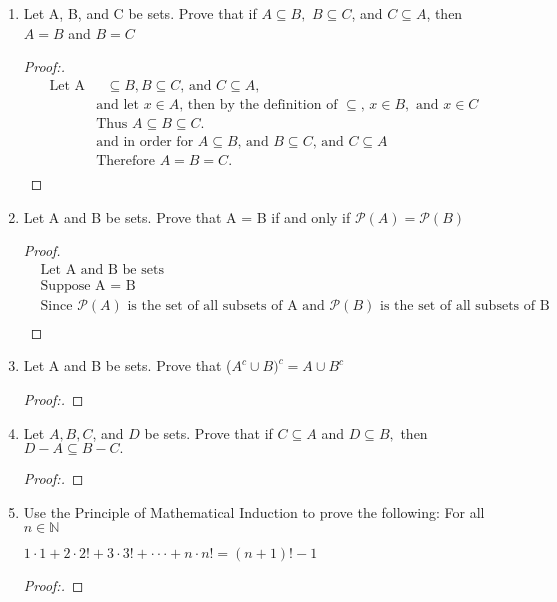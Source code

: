 \documentclass[11pt]{article}
\begin{document}
\begin{enumerate}
    \item Let A, B, and C be sets. Prove that if $A \subseteq B,$ $B \subseteq C$, and $C \subseteq A$, then $A = B$ and $B = C$
       \begin{proof}[Proof:\nopunct]
            \begin{align*}
                \text{Let A} & \text{ $\subseteq B, B \subseteq C$, and $C \subseteq A$,} \\
                & \text{and let $x\in  A$, then by the definition of $\subseteq$, $x\in B,$ and $x\in C$} \\
                & \text{Thus $A\subseteq B \subseteq C$.} \\
                & \text{and in order for $A \subseteq B$, and $B \subseteq C$, and $C\subseteq A$} \\
                & \text{Therefore $A=B=C.$} \\
            \end{align*}
        \end{proof}
        
    \item Let A and B be sets. Prove that A = B if and only if $\mathscr{P}(A) = \mathscr{P}(B)$
        \begin{proof}
            \begin{align*}
                & \text{Let A and B be sets} \\
                & \text{Suppose A = B} \\
                & \text{Since $\mathscr{P}(A)$ is the set of all subsets of A and $\mathscr{P}(B)$ is the set of all subsets of B} \\
            \end{align*}
        \end{proof}
        
    \item Let A and B be sets. Prove that ($A^c \cup B)^c = A \cup B^c$
        \begin{proof}[Proof:\nopunct]
        \end{proof}
        
    \item Let $A,B,C$, and $D$ be sets. Prove that if $C \subseteq A$ and $D \subseteq B,$ then $D-A\subseteq B-C.$
        \begin{proof}[Proof:\nopunct]
        \end{proof}
        
    \item Use the Principle of Mathematical Induction to prove the following: \newline
    For all $n \in \mathbb{N}$
    \begin{center}
        $1\cdot1+2\cdot2!+3\cdot3!+\cdot \cdot \cdot + n\cdot n!=(n+1)!-1$
    \end{center}
        \begin{proof}[Proof:\nopunct]
        \end{proof}
        

\end{enumerate}
\end{document}

